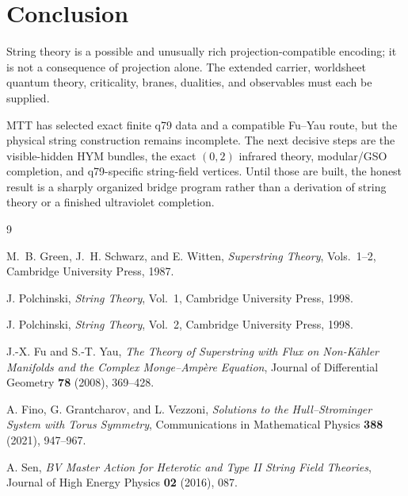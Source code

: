 \documentclass[11pt]{article}
\begin{document}
\section{Conclusion}

String theory is a possible and unusually rich projection-compatible
encoding; it is not a consequence of projection alone. The extended
carrier, worldsheet quantum theory, criticality, branes, dualities, and
observables must each be supplied.

MTT has selected exact finite q79 data and a compatible Fu--Yau route, but
the physical string construction remains incomplete. The next decisive
steps are the visible-hidden HYM bundles, the exact \((0,2)\) infrared
theory, modular/GSO completion, and q79-specific string-field vertices.
Until those are built, the honest result is a sharply organized bridge
program rather than a derivation of string theory or a finished ultraviolet
completion.

\begin{thebibliography}{9}

M.~B. Green, J.~H. Schwarz, and E. Witten,
\emph{Superstring Theory}, Vols.~1--2,
Cambridge University Press, 1987.

J. Polchinski,
\emph{String Theory}, Vol.~1,
Cambridge University Press, 1998.

J. Polchinski,
\emph{String Theory}, Vol.~2,
Cambridge University Press, 1998.

J.-X. Fu and S.-T. Yau,
\emph{The Theory of Superstring with Flux on Non-K\"ahler Manifolds and
the Complex Monge--Amp\`ere Equation},
Journal of Differential Geometry \textbf{78} (2008), 369--428.

A. Fino, G. Grantcharov, and L. Vezzoni,
\emph{Solutions to the Hull--Strominger System with Torus Symmetry},
Communications in Mathematical Physics \textbf{388} (2021), 947--967.

A. Sen,
\emph{BV Master Action for Heterotic and Type II String Field Theories},
Journal of High Energy Physics \textbf{02} (2016), 087.

\end{thebibliography}
\end{document}
